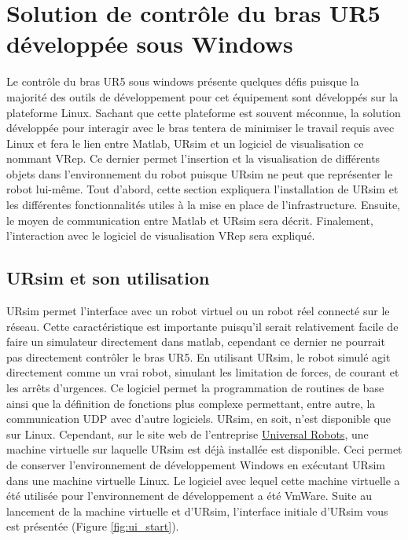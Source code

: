 \section{Solution de contrôle du bras UR5 développée sous Windows}

Le contrôle du bras UR5 sous windows présente quelques défis puisque la majorité des outils de développement pour cet équipement sont développés sur la plateforme Linux.
Sachant que cette plateforme est souvent méconnue, la solution développée pour interagir avec le bras tentera de minimiser le travail requis avec Linux et fera le lien entre Matlab, URsim et un logiciel de visualisation ce nommant VRep. 
Ce dernier permet l'insertion et la visualisation de différents objets dans l'environnement du robot puisque URsim ne peut que représenter le robot lui-même.
Tout d'abord, cette section expliquera l'installation de URsim et les différentes fonctionnalités utiles à la mise en place de l'infrastructure.
Ensuite, le moyen de communication entre Matlab et URsim sera décrit.
Finalement, l'interaction avec le logiciel de visualisation VRep sera expliqué.

\subsection{URsim et son utilisation}

URsim permet l'interface avec un robot virtuel ou un robot réel connecté sur le réseau.
Cette caractéristique est importante puisqu'il serait relativement facile de faire un simulateur directement dans matlab, cependant ce dernier ne pourrait pas directement contrôler le bras UR5.
En utilisant URsim, le robot simulé agit directement comme un vrai robot, simulant les limitation de forces, de courant et les arrêts d'urgences.
Ce logiciel permet la programmation de routines de base ainsi que la définition de fonctions plus complexe permettant, entre autre, la communication UDP avec d'autre logiciels.
URsim, en soit, n'est disponible que sur Linux.
Cependant, sur le site web de l'entreprise \href{https://www.universal-robots.com/download/}{Universal Robots}, une machine virtuelle sur laquelle URsim est déjà installée est disponible.
Ceci permet de conserver l'environnement de développement Windows en exécutant URsim dans une machine virtuelle Linux.
Le logiciel avec lequel cette machine virtuelle a été utilisée pour l'environnement de développement a été VmWare.
Suite au lancement de la machine virtuelle et d'URsim, l'interface initiale d'URsim vous est présentée (Figure \ref{fig:ui_start}).

